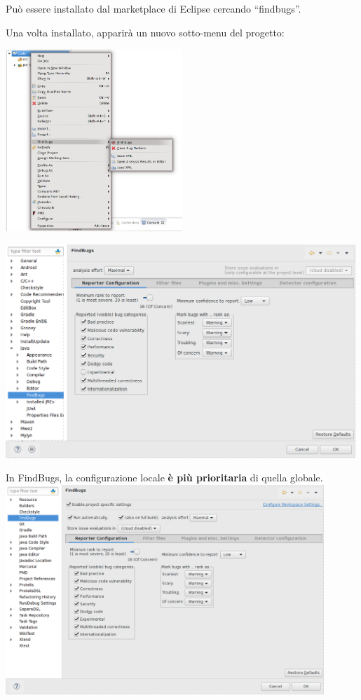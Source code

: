 \documentclass[presentation]{beamer}
\begin{document}
 {
	 {
		Può essere installato dal marketplace di Eclipse cercando ``findbugs''.
		
		Una volta installato, apparirà  un nuovo sotto-menu del progetto:
		
		\centering
		\includegraphics[width=0.5\textwidth]{img/findbugs}
	}
}

 {
	\centering
	\includegraphics[width=0.99\textwidth]{img/findbugsconf}
}

 {
  In FindBugs, la configurazione locale \textbf{è più prioritaria} di quella globale.
  \centering
  \includegraphics[width=0.9\textwidth]{img/findbugsproj}
}
\end{document}
